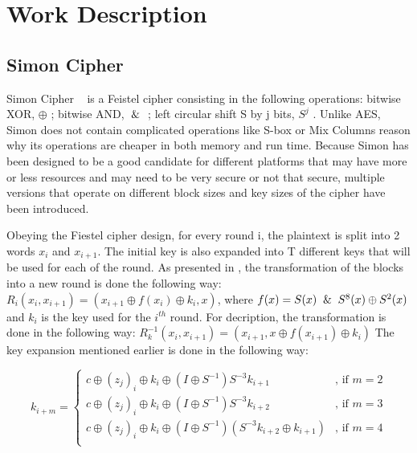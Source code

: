 \documentclass[conference]{IEEEtran}
\begin{document}
\section{Work Description}

\subsection{Simon Cipher}

Simon Cipher ~\cite{Beaulieu_Simon} is a Feistel cipher consisting in the following operations: bitwise XOR, $\oplus$ ; bitwise AND, $\And$ ; left circular shift S by j bits, $S^j$ . Unlike AES, Simon does not contain complicated operations like S-box or Mix Columns reason why its operations are cheaper in both memory and run time. Because Simon has been designed to be a good candidate for different platforms that may have more or less resources and may need to be very secure or not that secure, multiple versions that operate on different block sizes and key sizes of the cipher have been introduced.

Obeying the Fiestel cipher design, for every round i, the plaintext is split into 2 words $x_{i}$ and $x_{i+1}$. The initial key is also expanded into T different keys that will be used for each of the round. As presented in \cite{Beaulieu_Simon} , the transformation of the blocks into a new round is done the following way:
$R_{i}(x_{i}, x_{i+1}) = (x_{i+1} \oplus f(x_{i}) \oplus k_{i}, x)$, where
$f(x) = S(x) \And S^{8}(x) \oplus S^{2}(x)$ and $k_{i}$ is the key used for the $i^{th}$ round. For decription, the transformation is done in the following way:
$R_{k}^{-1}(x_{i}, x_{i+1}) = (x_{i+1}, x \oplus f(x_{i+1}) \oplus k_{i})$
The key expansion mentioned earlier is done in the following way:

\small
\begin{equation}
  k_{i+m} =
  \left\{
  \begin{array}{ll}
    c \oplus (z_{j})_{i} \oplus k_{i} \oplus (I \oplus S^{-1})S^{-3}k_{i+1} & \mbox{, if } m = 2 \\
    c \oplus (z_{j})_{i} \oplus k_{i} \oplus (I \oplus S^{-1})S^{-3}k_{i+2} & \mbox{, if } m = 3 \\
    c \oplus (z_{j})_{i} \oplus k_{i} \oplus (I \oplus S^{-1})(S^{-3}k_{i+2} \oplus k_{i+1}) & \mbox{, if } m = 4 \\
  \end{array}
  \right.
\end{equation}
\normalsize
\end{document}
